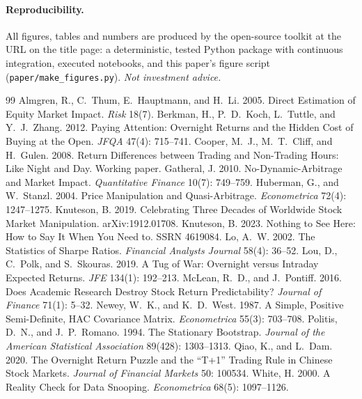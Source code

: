 \documentclass[11pt]{article}
\begin{document}
\paragraph{Reproducibility.} All figures, tables and numbers are produced by the
open-source toolkit at the URL on the title page: a deterministic, tested
Python package with continuous integration, executed notebooks, and this paper's
figure script (\texttt{paper/make\_figures.py}). \emph{Not investment advice.}

\begin{thebibliography}{99}
\small
{} Almgren, R., C.\ Thum, E.\ Hauptmann, and H.\ Li. 2005. Direct Estimation of Equity Market Impact. \emph{Risk} 18(7).
 Berkman, H., P.\ D.\ Koch, L.\ Tuttle, and Y.\ J.\ Zhang. 2012. Paying Attention: Overnight Returns and the Hidden Cost of Buying at the Open. \emph{JFQA} 47(4): 715--741.
 Cooper, M.\ J., M.\ T.\ Cliff, and H.\ Gulen. 2008. Return Differences between Trading and Non-Trading Hours: Like Night and Day. Working paper.
 Gatheral, J. 2010. No-Dynamic-Arbitrage and Market Impact. \emph{Quantitative Finance} 10(7): 749--759.
 Huberman, G., and W.\ Stanzl. 2004. Price Manipulation and Quasi-Arbitrage. \emph{Econometrica} 72(4): 1247--1275.
 Knuteson, B. 2019. Celebrating Three Decades of Worldwide Stock Market Manipulation. arXiv:1912.01708.
 Knuteson, B. 2023. Nothing to See Here: How to Say It When You Need to. SSRN 4619084.
 Lo, A.\ W. 2002. The Statistics of Sharpe Ratios. \emph{Financial Analysts Journal} 58(4): 36--52.
 Lou, D., C.\ Polk, and S.\ Skouras. 2019. A Tug of War: Overnight versus Intraday Expected Returns. \emph{JFE} 134(1): 192--213.
 McLean, R.\ D., and J.\ Pontiff. 2016. Does Academic Research Destroy Stock Return Predictability? \emph{Journal of Finance} 71(1): 5--32.
 Newey, W.\ K., and K.\ D.\ West. 1987. A Simple, Positive Semi-Definite, HAC Covariance Matrix. \emph{Econometrica} 55(3): 703--708.
 Politis, D.\ N., and J.\ P.\ Romano. 1994. The Stationary Bootstrap. \emph{Journal of the American Statistical Association} 89(428): 1303--1313.
 Qiao, K., and L.\ Dam. 2020. The Overnight Return Puzzle and the ``T+1'' Trading Rule in Chinese Stock Markets. \emph{Journal of Financial Markets} 50: 100534.
 White, H. 2000. A Reality Check for Data Snooping. \emph{Econometrica} 68(5): 1097--1126.
\end{thebibliography}
\end{document}
